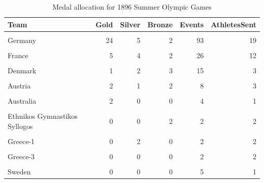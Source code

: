 \documentclass[
]{article}
\begin{document}
\begin{table}[H]
\centering
\caption{\label{tab:SummerBreakDownWinners3}Medal allocation for 1896 Summer Olympic Games}
\centering
\fontsize{7}{9}\selectfont
\begin{tabular}[t]{lrrrrr}
\toprule
Team & Gold & Silver & Bronze & Events & AthletesSent\\
\midrule
\cellcolor{gray!10}{Greece} & \cellcolor{gray!10}{10} & \cellcolor{gray!10}{16} & \cellcolor{gray!10}{18} & \cellcolor{gray!10}{140} & \cellcolor{gray!10}{101}\\
Germany & 24 & 5 & 2 & 93 & 19\\
\cellcolor{gray!10}{United States} & \cellcolor{gray!10}{11} & \cellcolor{gray!10}{7} & \cellcolor{gray!10}{2} & \cellcolor{gray!10}{27} & \cellcolor{gray!10}{14}\\
France & 5 & 4 & 2 & 26 & 12\\
\cellcolor{gray!10}{Great Britain} & \cellcolor{gray!10}{2} & \cellcolor{gray!10}{3} & \cellcolor{gray!10}{2} & \cellcolor{gray!10}{23} & \cellcolor{gray!10}{10}\\
\addlinespace
Denmark & 1 & 2 & 3 & 15 & 3\\
\cellcolor{gray!10}{Hungary} & \cellcolor{gray!10}{2} & \cellcolor{gray!10}{1} & \cellcolor{gray!10}{3} & \cellcolor{gray!10}{18} & \cellcolor{gray!10}{7}\\
Austria & 2 & 1 & 2 & 8 & 3\\
\cellcolor{gray!10}{Switzerland} & \cellcolor{gray!10}{1} & \cellcolor{gray!10}{2} & \cellcolor{gray!10}{0} & \cellcolor{gray!10}{8} & \cellcolor{gray!10}{3}\\
Australia & 2 & 0 & 0 & 4 & 1\\
\addlinespace
\cellcolor{gray!10}{Australia/Great Britain} & \cellcolor{gray!10}{0} & \cellcolor{gray!10}{0} & \cellcolor{gray!10}{2} & \cellcolor{gray!10}{2} & \cellcolor{gray!10}{2}\\
Ethnikos Gymnastikos Syllogos & 0 & 0 & 2 & 2 & 2\\
\cellcolor{gray!10}{Great Britain/Germany} & \cellcolor{gray!10}{2} & \cellcolor{gray!10}{0} & \cellcolor{gray!10}{0} & \cellcolor{gray!10}{2} & \cellcolor{gray!10}{2}\\
Greece-1 & 0 & 2 & 0 & 2 & 2\\
\cellcolor{gray!10}{Greece-2} & \cellcolor{gray!10}{0} & \cellcolor{gray!10}{0} & \cellcolor{gray!10}{0} & \cellcolor{gray!10}{2} & \cellcolor{gray!10}{2}\\
\addlinespace
Greece-3 & 0 & 0 & 0 & 2 & 2\\
\cellcolor{gray!10}{Italy} & \cellcolor{gray!10}{0} & \cellcolor{gray!10}{0} & \cellcolor{gray!10}{0} & \cellcolor{gray!10}{1} & \cellcolor{gray!10}{1}\\
Sweden & 0 & 0 & 0 & 5 & 1\\
\bottomrule
\end{tabular}
\end{table}
\end{document}
